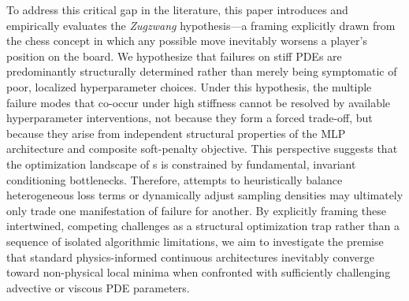 To address this critical gap in the literature, this paper introduces and empirically evaluates the \textit{Zugzwang} hypothesis—a framing explicitly drawn from the chess concept in which any possible move inevitably worsens a player's position on the board. We hypothesize that \PINN{} failures on stiff PDEs are predominantly structurally determined rather than merely being symptomatic of poor, localized hyperparameter choices. Under this hypothesis, the multiple failure modes that co-occur under high stiffness cannot be resolved by available hyperparameter interventions, not because they form a forced trade-off, but because they arise from independent structural properties of the MLP architecture and composite soft-penalty objective. This perspective suggests that the optimization landscape of \PINN{}s is constrained by fundamental, invariant conditioning bottlenecks. Therefore, attempts to heuristically balance heterogeneous loss terms or dynamically adjust sampling densities may ultimately only trade one manifestation of failure for another. By explicitly framing these intertwined, competing challenges as a structural optimization trap rather than a sequence of isolated algorithmic limitations, we aim to investigate the premise that standard physics-informed continuous architectures inevitably converge toward non-physical local minima when confronted with sufficiently challenging advective or viscous PDE parameters.

